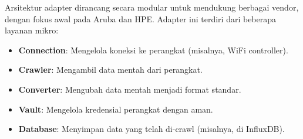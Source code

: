 Arsitektur adapter dirancang secara modular untuk mendukung berbagai vendor, dengan fokus awal pada Aruba dan HPE. Adapter ini terdiri dari beberapa layanan mikro:
\begin{itemize}
    \item \textbf{Connection}: Mengelola koneksi ke perangkat (misalnya, WiFi controller).
    \item \textbf{Crawler}: Mengambil data mentah dari perangkat.
    \item \textbf{Converter}: Mengubah data mentah menjadi format standar.
    \item \textbf{Vault}: Mengelola kredensial perangkat dengan aman.
    \item \textbf{Database}: Menyimpan data yang telah di-crawl (misalnya, di InfluxDB).
\end{itemize}

